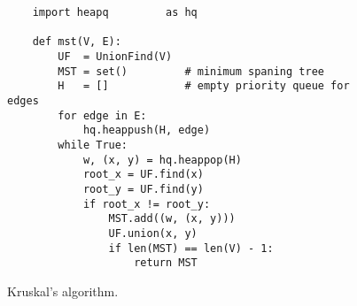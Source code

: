 \begin{figure}[!ht]
\centering
\begin{verbatim}
    import heapq         as hq

    def mst(V, E):
        UF  = UnionFind(V)
        MST = set()         # minimum spaning tree
        H   = []            # empty priority queue for edges
        for edge in E:
            hq.heappush(H, edge)
        while True:
            w, (x, y) = hq.heappop(H)
            root_x = UF.find(x)
            root_y = UF.find(y)
            if root_x != root_y:
                MST.add((w, (x, y)))
                UF.union(x, y)
                if len(MST) == len(V) - 1:
                    return MST
\end{verbatim}
\vspace*{-0.3cm}
\caption{Kruskal's algorithm.}
\label{fig:Kruskal.ipynb}
\end{figure}


